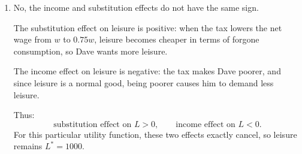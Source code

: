 \documentclass[12pt,a4paper]{article}
\begin{document}
\begin{enumerate}[label=\alph*.]
\begin{center}
    \end{center}
    \noindent\textbf{Legend:}
    \begin{itemize}
    \item \textcolor{blue}{Blue solid line}: original budget line
    \item \textcolor{cyan}{Cyan solid line}: tax budget line
    \item \textcolor{green!50!black}{Green dashed line}: compensated budget line
    \item \textcolor{orange}{Orange curve}: original indifference curve
    \item \textcolor{red}{Red curve}: tax indifference curve
    \item \textcolor{purple}{Purple arrow}: substitution effect
    \item \textcolor{teal}{Teal arrow}: income effect
    \end{itemize}

  \item No, the income and substitution effects do not have the same sign.

  The substitution effect on leisure is positive: when the tax lowers the net wage from \(w\) to \(0.75w\), leisure becomes cheaper in terms of forgone consumption, so Dave wants more leisure.

  The income effect on leisure is negative: the tax makes Dave poorer, and since leisure is a normal good, being poorer causes him to demand less leisure.

  Thus:
  \[
    \text{substitution effect on }L>0,
    \qquad
    \text{income effect on }L<0.
  \]
  For this particular utility function, these two effects exactly cancel, so leisure remains \(L^*=1000\).
\end{enumerate}
\end{document}
